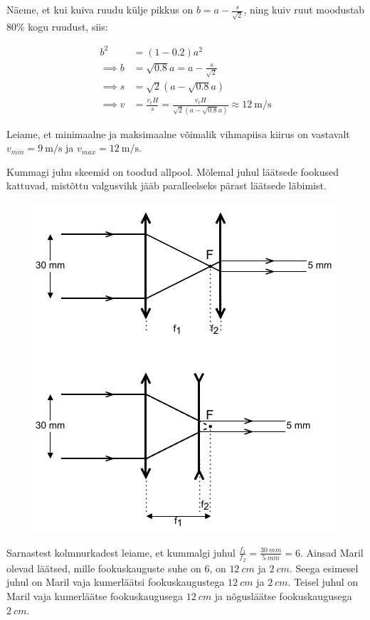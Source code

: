 \documentclass[10pt]{article}
\begin{document}
Näeme, et kui kuiva ruudu külje pikkus on $b = a-\frac{s}{\sqrt{2}}$, ning kuiv ruut moodustab 80\% kogu ruudust, siis:

\begin{align*}
    b^2 &= (1-0.2)a^2\\
    \implies b &= \sqrt{0.8} a = a - \frac{s}{\sqrt{2}}\\
    \implies s &= \sqrt{2}(a-\sqrt{0.8}a) \\ 
    \implies v &= \frac{v_t H}{s} = \frac{v_t H}{\sqrt{2}(a-\sqrt{0.8}a)} \approx \SI{12}{\meter\per\second}
\end{align*}

Leiame, et minimaalne ja maksimaalne võimalik vihmapiisa kiirus on vastavalt $v_{min} = \SI{9}{\meter\per\second}$ ja $v_{max} = \SI{12}{\meter\per\second}$.
\probend
\bigskip


\solu
Kummagi juhu skeemid on toodud allpool. Mõlemal juhul läätsede fookused kattuvad, mistõttu valgusvihk jääb paralleelseks pärast läätsede läbimist.

\begin{figure}[h]
    \centering
    \includegraphics[width=.5\linewidth]{2023-v2g-01-yl.pdf}
\end{figure}

Sarnastest kolmnurkadest leiame, et kummalgi juhul $\frac{f_1}{f_2} = \frac{\SI{30}{mm}}{\SI{5}{mm}} = 6$. Ainsad Maril olevad läätsed, mille fookuskauguste suhe on $6$, on $\SI{12}{cm}$ ja $\SI{2}{cm}$. Seega esimesel juhul on Maril vaja kumerläätsi fookuskaugustega $\SI{12}{cm}$ ja $\SI{2}{cm}$. Teisel juhul on Maril vaja kumerläätse fookuskaugusega $\SI{12}{cm}$ ja nõgusläätse fookuskaugusega $\SI{2}{cm}$.
\end{document}
